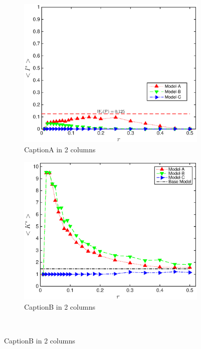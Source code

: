 \documentclass[10pt,journal,compsoc]{IEEEtran}
\theoremstyle{plain}
\theoremstyle{definition}
\theoremstyle{remark}
\begin{document}
\begin{figure}[!tbp]
	\begin{subfigure}{\columnwidth}%
		\includegraphics[width=\columnwidth]
			{Fig-FigureA}
		\caption{CaptionA in 2 columns} 
		\label{fig:figureAin2}
	\end{subfigure}
	\begin{subfigure}{\columnwidth}%
		\includegraphics[width=\columnwidth]
			{Fig-FigureB}
		\caption{CaptionB in 2 columns} 
		\label{fig:figureBin2}
	\end{subfigure}\\

\end{figure}
\end{document}
